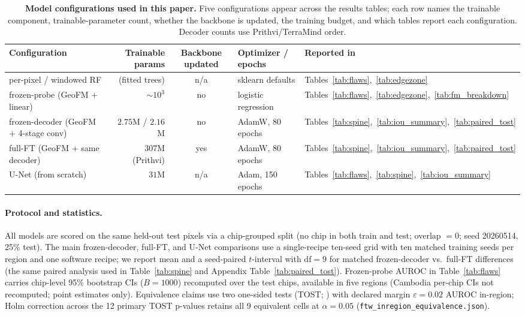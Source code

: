 \documentclass{article}
\begin{document}
\begin{table}[!htb]\centering\footnotesize
\caption{\textbf{Model configurations used in this paper.} Five configurations
appear across the results tables; each row names the trainable component,
trainable-parameter count, whether the backbone is updated, the training budget,
and which tables report each configuration. Decoder counts use Prithvi/TerraMind order.}
\label{tab:configs}
\begin{tabular}{lrcll}
\toprule
Configuration & Trainable params & Backbone updated & Optimizer / epochs & Reported in \\
\midrule
per-pixel / windowed RF & (fitted trees) & n/a & sklearn defaults & Tables~\ref{tab:flaws},~\ref{tab:edgezone} \\
frozen-probe (GeoFM $+$ linear) & ${\sim}10^{3}$ & no & logistic regression & Tables~\ref{tab:flaws},~\ref{tab:edgezone},~\ref{tab:fm_breakdown} \\
frozen-decoder (GeoFM $+$ 4-stage conv) & $2.75$M / $2.16$M & no & AdamW, 80 epochs & Tables~\ref{tab:spine},~\ref{tab:iou_summary},~\ref{tab:paired_tost} \\
full-FT (GeoFM $+$ same decoder) & $307$M (Prithvi) & yes & AdamW, 80 epochs & Tables~\ref{tab:spine},~\ref{tab:iou_summary},~\ref{tab:paired_tost} \\
U-Net (from scratch) & $31$M & n/a & Adam, 150 epochs & Tables~\ref{tab:flaws},~\ref{tab:spine},~\ref{tab:iou_summary} \\
\bottomrule
\end{tabular}
\end{table}
\paragraph{Protocol and statistics.} All models are scored on the same held-out test
pixels via a chip-grouped split (no chip in both train and test; overlap $=0$; seed
20260514, 25\% test). The main frozen-decoder, full-FT, and U-Net comparisons use a
single-recipe ten-seed grid with ten matched training seeds per region and one software recipe;
we report mean and a seed-paired $t$-interval with $\mathrm{df}=9$ for matched
frozen-decoder vs.\ full-FT differences (the same paired analysis used in
Table~\ref{tab:spine} and Appendix Table~\ref{tab:paired_tost}). Frozen-probe AUROC in
Table~\ref{tab:flaws} carries chip-level 95\% bootstrap CIs ($B{=}1000$) recomputed
over the test chips, available in five regions (Cambodia per-chip CIs not
recomputed; point estimates only). Equivalence claims use two one-sided tests
(TOST; \citealp{lakens2017equivalence}) with declared margin
$\varepsilon{=}0.02$ AUROC in-region; Holm correction across the 12 primary TOST
p-values retains all 9 equivalent cells at $\alpha{=}0.05$
(\verb|ftw_inregion_equivalence.json|).
\end{document}
